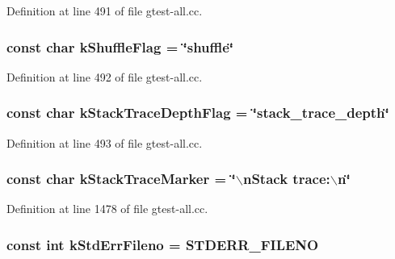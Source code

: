 \-Definition at line 491 of file gtest-\/all.\-cc.

\hypertarget{namespacetesting_1_1internal_a49a373cb8c0bc9eae2a39e8122e753cc}{
\subsubsection[{k\-Shuffle\-Flag}]{\setlength{\rightskip}{0pt plus 5cm}const char {\bf k\-Shuffle\-Flag} = \char`\"{}shuffle\char`\"{}}}\label{d0/da7/namespacetesting_1_1internal_a49a373cb8c0bc9eae2a39e8122e753cc}


\-Definition at line 492 of file gtest-\/all.\-cc.

\hypertarget{namespacetesting_1_1internal_a8dc0484b79056e6319003f4a933c7c9b}{
\subsubsection[{k\-Stack\-Trace\-Depth\-Flag}]{\setlength{\rightskip}{0pt plus 5cm}const char {\bf k\-Stack\-Trace\-Depth\-Flag} = \char`\"{}stack\-\_\-trace\-\_\-depth\char`\"{}}}\label{d0/da7/namespacetesting_1_1internal_a8dc0484b79056e6319003f4a933c7c9b}


\-Definition at line 493 of file gtest-\/all.\-cc.

\hypertarget{namespacetesting_1_1internal_a735beafdf3dc508442f783a0269ca0f5}{
\subsubsection[{k\-Stack\-Trace\-Marker}]{\setlength{\rightskip}{0pt plus 5cm}const char {\bf k\-Stack\-Trace\-Marker} = \char`\"{}$\backslash$n\-Stack trace\-:$\backslash$n\char`\"{}}}\label{d0/da7/namespacetesting_1_1internal_a735beafdf3dc508442f783a0269ca0f5}


\-Definition at line 1478 of file gtest-\/all.\-cc.

\hypertarget{namespacetesting_1_1internal_a5bfafb8c85988c397157e055965ad46c}{
\subsubsection[{k\-Std\-Err\-Fileno}]{\setlength{\rightskip}{0pt plus 5cm}const int {\bf k\-Std\-Err\-Fileno} = \-S\-T\-D\-E\-R\-R\-\_\-\-F\-I\-L\-E\-N\-O}}\label{d0/da7/namespacetesting_1_1internal_a5bfafb8c85988c397157e055965ad46c}


